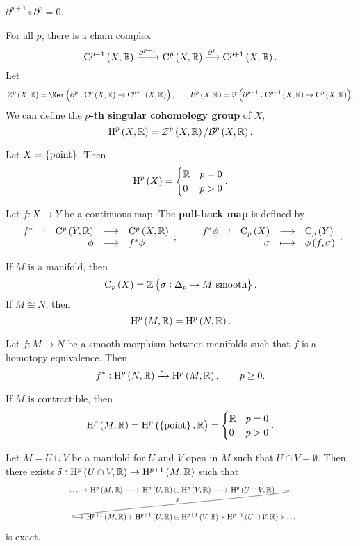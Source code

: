 \begin{exercise*}
$ \partial^{p + 1} \circ \partial^p = 0 $.
\end{exercise*}

For all $ p $, there is a chain complex
$$ \C^{p - 1}\br{X, \RR} \xrightarrow{\partial^{p - 1}} \C^p\br{X, \RR} \xrightarrow{\partial^p} \C^{p + 1}\br{X, \RR}. $$
Let
$$ \ZZZ^p\br{X, \RR} = \Ker \br{\partial^p : \C^p\br{X, \RR} \to \C^{p + 1}\br{X, \RR}}, \qquad \BBB^p\br{X, \RR} = \Im \br{\partial^{p - 1} : \C^{p - 1}\br{X, \RR} \to \C^p\br{X, \RR}}. $$
We can define the \textbf{$ p $-th singular cohomology group} of $ X $,
$$ \H^p\br{X, \RR} = \ZZZ^p\br{X, \RR} / \BBB^p\br{X, \RR}. $$

\begin{exercise*}
Let $ X = \cbr{\text{point}} $. Then
$$ \H^p\br{X} =
\begin{cases}
\RR & p = 0 \\
0 & p > 0
\end{cases}.
$$
\end{exercise*}

\pagebreak

Let $ f : X \to Y $ be a continuous map. The \textbf{pull-back map} is defined by
$$ \function[f^*]{\C^p\br{Y, \RR}}{\C^p\br{X, \RR}}{\phi}{f^*\phi}, \qquad \function[f^*\phi]{\C_p\br{X}}{\C_p\br{Y}}{\sigma}{\phi\br{f_*\sigma}}. $$


If $ M $ is a manifold, then
$$ \C_p\br{X} = \ZZ\cbr{\sigma : \Delta_p \to M \ \text{smooth}}. $$
If $ M \cong N $, then
$$ \H^p\br{M, \RR} = \H^p\br{N, \RR}. $$

\begin{theorem}
Let $ f : M \to N $ be a smooth morphism between manifolds such that $ f $ is a homotopy equivalence. Then
$$ f^* : \H^p\br{N, \RR} \xrightarrow{\sim} \H^p\br{M, \RR}, \qquad p \ge 0. $$
\end{theorem}

\begin{example*}
If $ M $ is contractible, then
$$ \H^p\br{M, \RR} = \H^p\br{\cbr{\text{point}}, \RR} =
\begin{cases}
\RR & p = 0 \\
0 & p > 0
\end{cases}.
$$
\end{example*}

\begin{theorem}
Let $ M = U \cup V $ be a manifold for $ U $ and $ V $ open in $ M $ such that $ U \cap V = \emptyset $. Then there exists $ \delta : \H^p\br{U \cap V, \RR} \to \H^{p + 1}\br{M, \RR} $ such that
$$
\begin{tikzcd}[column sep=0.1cm]
\dots \arrow{r} & \H^p\br{M, \RR} \arrow{r} & \H^p\br{U, \RR} \oplus \H^p\br{V, \RR} \arrow{r} & \H^p\br{U \cap V, \RR} \arrow[in=180, out=0, swap]{dll}{\delta} & \\
& \H^{p + 1}\br{M, \RR} \arrow{r} & \H^{p + 1}\br{U, \RR} \oplus \H^{p + 1}\br{V, \RR} \arrow{r} & \H^{p + 1}\br{U \cap V, \RR} \arrow{r} & \dots
\end{tikzcd}
$$
is exact.
\end{theorem}

